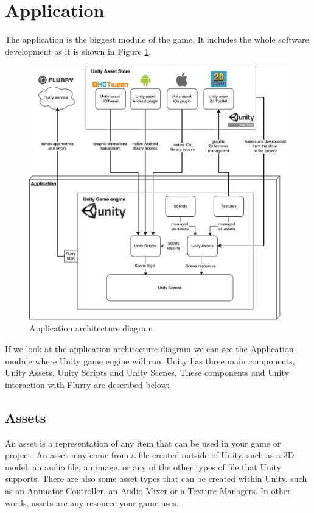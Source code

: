 \newpage
\section{Application}
\label{sec:application}
The application is the biggest module of the game. It includes the whole software development as it is shown in Figure \ref{fig:applicationarchitecture}.

\begin{figure}[ht!]
	\centering
	\includegraphics[width=400pt]{graphics/architecture/Application_architecture.pdf}
	\caption{Application architecture diagram}
	\label{fig:applicationarchitecture}
\end{figure}

If we look at the application architecture diagram we can see the Application module where Unity game engine will run. Unity has three main components, Unity Assets, Unity Scripts and Unity Scenes. These components and Unity interaction with Flurry are described below:

\subsection{Assets}
An asset is a representation of any item that can be used in your game or project. An asset may come from a file created outside of Unity, such as a 3D model, an audio file, an image, or any of the other types of file that Unity supports. There are also some asset types that can be created within Unity, such as an Animator Controller, an Audio Mixer or a Texture Managers. In other words, assets are any resource your game uses.

